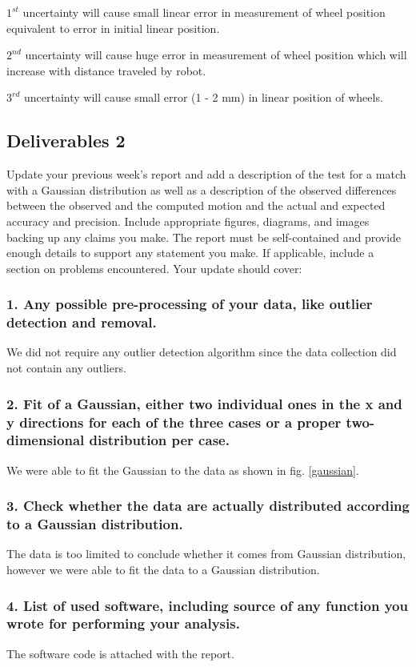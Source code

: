 $1^{st}$ uncertainty will cause small linear error in measurement of wheel position equivalent to error in initial linear position.

$2^{nd}$ uncertainty will cause huge error in measurement of wheel position which will increase with distance traveled by robot. 

$3^{rd}$ uncertainty will cause small error (1 - 2 mm) in linear position of wheels.

\sectionLine
\subsection*{Deliverables 2}
Update your previous week’s report and add a description of the test for a match with a Gaussian distribution as well as a description of the observed differences between the observed and the computed motion and the actual and expected accuracy and precision. Include appropriate figures, diagrams, and images backing up any claims you make. The report must be self-contained and provide enough details to support any statement you make. If applicable, include a section on problems encountered. Your update should cover:

\subsubsection*{1. Any possible pre-processing of your data, like outlier detection and removal.}
We did not require any outlier detection algorithm since the data collection did not contain any outliers.

\subsubsection*{2. Fit of a Gaussian, either two individual ones in the x and y directions for each of the three cases or a proper two-dimensional distribution per case.}
We were able to fit the Gaussian to the data as shown in fig. \ref{gaussian}.

\subsubsection*{3. Check whether the data are actually distributed according to a Gaussian distribution.}
The data is too limited to conclude whether it comes from Gaussian distribution, however we were able to fit the data to a Gaussian distribution.

\subsubsection*{4. List of used software, including source of any function you wrote for performing your analysis.}
The software code is attached with the report.

